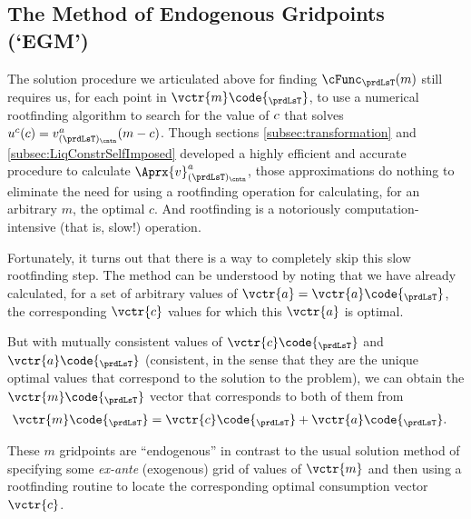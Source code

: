 \documentclass[SolvingMicroDSOPs]{subfiles}
\begin{document}
\hypertarget{the-method-of-endogenous-gridpoints}{}
\subsection{The Method of Endogenous Gridpoints (`EGM')}\label{subsec:egm}

The solution procedure we articulated above for finding $\cFunc_{\prdLsT}(m)$ still requires us, for each point in $\vctr{m}\code{_{\prdLsT}}$, to use a numerical rootfinding algorithm to search for the value of $c$ that solves $\uFunc^{c}(\cNrm) = \vFunc^{a}_{(\prdLsT)_\cntn}(m-\cNrm)$.  Though sections \ref{subsec:transformation} and \ref{subsec:LiqConstrSelfImposed} developed a highly efficient and accurate procedure to calculate $\Aprx{\vFunc}^{a}_{(\prdLsT)_\cntn}$, those approximations do nothing to eliminate the need for using a rootfinding operation for calculating, for an arbitrary $m$, the optimal $c$.  And rootfinding is a notoriously computation-intensive (that is, slow!) operation.

Fortunately, it turns out that there is a way to completely skip this slow rootfinding step.  The method can be understood by noting that we have already calculated, for a set of arbitrary values of $\vctr{a}=\vctr{a}\code{_{\prdLsT}}$, the corresponding $\vctr{c}$ values for which this $\vctr{a}$ is optimal.


But with mutually consistent values of $\vctr{c}\code{_{\prdLsT}}$ and $\vctr{a}\code{_{\prdLsT}}$ (consistent, in the sense that they are the unique optimal values that correspond to the solution to the problem), we can obtain the $\vctr{m}\code{_{\prdLsT}}$ vector that corresponds to both of them from
\begin{equation}\begin{gathered}\begin{aligned}
      \vctr{m}\code{_{\prdLsT}}  & = {\vctr{\cNrm}\code{_{\prdLsT}}+\vctr{a}\code{_{\prdLsT}}}.
    \end{aligned}\end{gathered}\end{equation}


These $m$ gridpoints are ``endogenous'' in contrast to the usual solution method of specifying some \textit{ex-ante} (exogenous) grid of values of $\vctr{m}$ and then using a rootfinding routine to locate the corresponding optimal consumption vector $\vctr{c}$.
\end{document}
